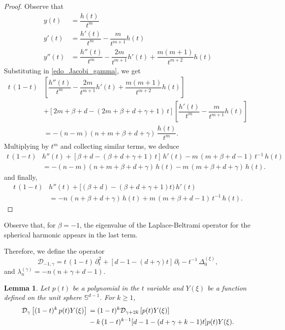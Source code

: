 \documentclass{amsart}
\newtheorem{lem}[thm]{Lemma}
\theoremstyle{remark}
\def\sph{{\mathbb{S}^{d-1}}}
\def\b{{\beta}}
\def\g{{\gamma}}
\def\CD{{\mathcal D}}
\begin{document}
\begin{proof}
Observe that
\begin{align*}
y(t) & = \dfrac{h(t)}{t^m}\\
y'(t) & = \dfrac{h'(t)}{t^m} -\dfrac{m}{t^{m+1}}h(t)\\
y''(t) &= \dfrac{h''(t)}{t^m} - \dfrac{2m}{t^{m+1}}h'(t) + \dfrac{m(m+1)}{t^{m+2}}h(t)
\end{align*}
Substituting in \eqref{edo_Jacobi_gamma}, we get
\begin{align*}
t\,(1-t) &\left[\dfrac{h''(t)}{t^m} - \dfrac{2m}{t^{m+1}}h'(t) + \dfrac{m(m+1)}{t^{m+2}}h(t)\right]\\
& + [2m+\b +d-(2m+\b+d + \gamma + 1)\,t]\left[\dfrac{h'(t)}{t^m} -\dfrac{m}{t^{m+1}}h(t)\right] \\
& = -(n-m)(n + m +\b+d+\gamma)\,\dfrac{h(t)}{t^m}.
\end{align*}
Multiplying by $t^m$ and collecting similar terms, we deduce
\begin{align*}
t\,(1-t) & h''(t) + [\b +d - (\beta + d + \gamma+1)\,t] \, h'(t) - m\,(m+\beta+d-1) \, t^{-1}\,h(t)\\
& = -(n-m)(n + m +\b+d+ \gamma)\,h(t) - m\,(m+\beta+d + \gamma) \, h(t).
\end{align*}
and finally,
\begin{align*}
t\,(1-t) & h''(t) + [(\b +d)-(\b+d+\g+1)t) \, h'(t) \\
& = - n\,(n + \b+d+\gamma)\,h(t) + m\,(m+\beta+d-1) \, t^{-1}\,h(t).
\end{align*}

\end{proof}

Observe that, for $\b=-1$, the eigenvalue of the Laplace-Beltrami operator for the spherical harmonic appears in the last term.

Therefore, we define the operator
\begin{equation}\label{PDE_Operator}
\mathcal{D}_{-1,\gamma} = t \,(1-t)\,\partial_{t}^2 + [d-1-(d+\gamma)t]\,\partial_t - t^{-1}\,\Delta_0^{(\xi)},
\end{equation}
and $\lambda_n^{(\gamma)} = -n(n+\gamma+d-1)$.
\fi

\begin{lem}
Let $p(t)$ be a polynomial in the $t$ variable and $Y(\xi)$ be a function defined on the unit sphere $\sph$.
For $k \geq 1$,
\begin{align}\label{eq:D_gamma}
\CD_{\gamma} \left [(1-t)^k\,p(t) Y(\xi) \right] \, & = (1-t)^k \CD_{\gamma+2k}\left [p(t) Y (\xi)\right] \\
& - k\,(1-t)^{k-1} [d-1-(d+\g+k-1)t] p(t)Y(\xi). \notag
\end{align}
\end{lem}
\end{document}
